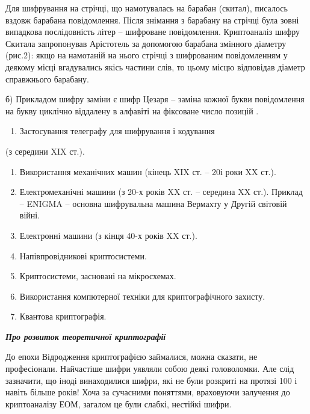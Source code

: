 \documentclass[a4paper]{article}
\newcounter{saveenum}
\newcommand\liststyleWWviiiNumxl{%
\renewcommand\theenumi{\arabic{enumi}}
\renewcommand\theenumii{\arabic{enumii}}
\renewcommand\theenumiii{\arabic{enumiii}}
\renewcommand\theenumiv{\arabic{enumiv}}
\renewcommand\labelenumi{\theenumi.}
\renewcommand\labelenumii{\theenumii.}
\renewcommand\labelenumiii{\theenumiii.}
\renewcommand\labelenumiv{\theenumiv.}
}
\newcounter{}
\begin{document}
\bigskip


\bigskip

Для шифрування на стрічці, що намотувалась на барабан (скитал), писалось вздовж
барабана повідомлення. Після знімання з барабану на стрічці була зовні
випадкова послідовність літер – шифроване повідомлення. Криптоаналіз шифру
Скитала запропонував Арістотель за допомогою барабана змінного діаметру
(рис.2): якщо на намотаній на нього стрічці з шифрованим повідомленням у
деякому місці вгадувались якісь частини слів, то цьому місцю відповідав діаметр
справжнього барабану. 

б) Прикладом шифру заміни є шифр Цезаря –  заміна кожної букви повідомлення на
букву  циклічно віддалену в алфавіті на фіксоване число позицій .

\liststyleWWviiiNumxl
\setcounter{saveenum}{\value{enumi}}
\begin{enumerate}
\setcounter{enumi}{\value{saveenum}}
\item Застосування телеграфу для шифрування і кодування  
\end{enumerate}
 (з середини XIX ст.).

\liststyleWWviiiNumxl
\setcounter{saveenum}{\value{enumi}}
\begin{enumerate}
\setcounter{enumi}{\value{saveenum}}
\item Використання механічних машин (кінець XIX ст. – 20і роки XX ст.).
\item Електромеханічні машини (з 20-х років XX ст. – середина XX ст.). Приклад –
ENIGMA – основна шифрувальна машина Вермахту у Другій світовій війні.
\item Електронні машини (з кінця 40-х років XX ст.).
\item Напівпровідникові криптосистеми.
\item Криптосистеми, засновані на мікросхемах.
\item Використання комп{\textquotesingle}ютерної техніки для криптографічного
захисту.
\item Квантова криптографія.
\end{enumerate}

\bigskip


\bigskip

{\centering\bfseries\itshape
Про розвиток теоретичної криптографії
\par}


\bigskip


\bigskip

До епохи Відродження криптографією займалися, можна сказати, не професіонали.
Найчастіше шифри уявляли  собою деякі головоломки. Але слід зазначити, що іноді
винаходилися шифри, які не були розкриті на протязі  100 і навіть більше років!
Хоча за сучасними  поняттями,  враховуючи залучення до криптоаналізу ЕОМ,
загалом це були  слабкі, нестійкі шифри.
\end{document}
